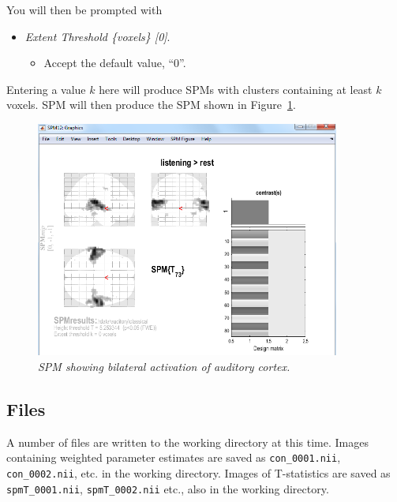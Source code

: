 
You will then be prompted with

\begin{itemize}
\item \emph{Extent Threshold \{voxels\} [0]}.
\begin{itemize}
\item Accept the default value, ``0''.
\end{itemize}
\end{itemize}

Entering a value $k$ here will produce SPMs with clusters containing at least $k$ voxels. SPM will then produce the SPM shown in Figure~\ref{aud_spm1}.

\begin{figure}
\begin{center}
\includegraphics[width=100mm]{auditory/spm1}
\caption{\em SPM showing bilateral activation of auditory cortex. \label{aud_spm1}}
\end{center}
\end{figure}

\subsection{Files}

A number of files are written to the working directory at this time.
Images containing weighted parameter estimates are saved as \texttt{con\_0001.nii}, \texttt{con\_0002.nii}, etc. in the working directory. Images of T-statistics are saved as \texttt{spmT\_0001.nii}, \texttt{spmT\_0002.nii} etc., also in the working directory.

